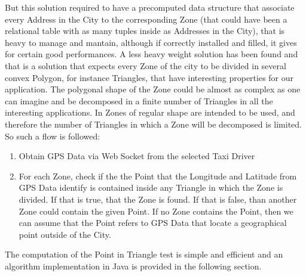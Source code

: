 But this solution required to have a precomputed data structure that associate every Address in the City to the corresponding Zone (that could have been a relational table with as many tuples inside as Addresses in the City), that is heavy to manage and mantain, although if correctly installed and filled, it gives for certain good performances.
A less heavy weight solution has been found and that is a solution that expects every Zone of the city to be divided in several convex Polygon, for instance Triangles, that have interesting properties for our application.
The polygonal shape of the Zone could be almost as complex as one can imagine and be decomposed in a finite number of Triangles in all the interesting applications.
In \myTaxiService{} Zones of regular shape are intended to be used, and therefore the number of Triangles in which a Zone will be decomposed is limited.
So such a flow is followed:
\begin{enumerate}
	\item Obtain GPS Data via Web Socket from the selected Taxi Driver
	\item For each Zone, check if the the Point that the Longitude and Latitude from GPS Data identify is contained inside any Triangle in which the Zone is divided. If that is true, that the Zone is found. If that is false, than another Zone could contain the given Point. If no Zone contains the Point, then we can assume that the Point refers to GPS Data that locate a geographical point outside of the City.
\end{enumerate}
The computation of the Point in Triangle test is simple and efficient and an algorithm implementation in Java is provided in the following section.
